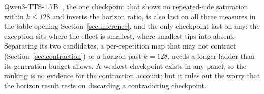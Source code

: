 Qwen3-TTS-1.7B~\cite{hu2026qwen3tts}, the one checkpoint that shows no repeated-side saturation
within $k\le128$ and inverts the horizon ratio, is also last on all three measures in the table
opening Section~\ref{sec:inference}, and the only checkpoint last on any: the exception sits
where the effect is smallest, where smallest tips into absent. Separating its two candidates, a
per-repetition map that may not contract (Section~\ref{sec:contraction}) or a horizon past
$k=128$, needs a longer ladder than its generation budget allows. A weakest checkpoint exists
in any panel, so the ranking is no evidence for the contraction account; but it rules out the worry that
the horizon result rests on discarding a contradicting checkpoint.

